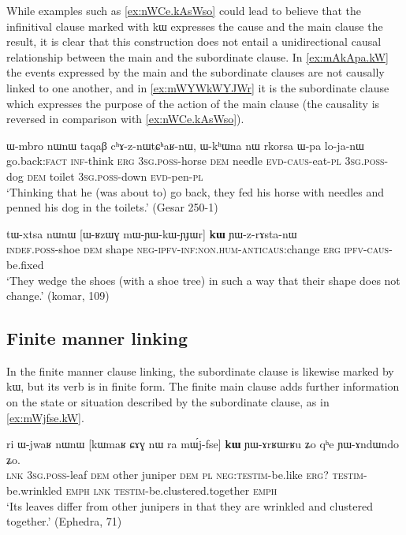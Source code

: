 \documentclass[oldfontcommands,oneside,a4paper,11pt]{article}
\newcommand{\ipa}[1]{{\phon #1}} %
\begin{document}
 While  examples such as \ref{ex:nWCe.kAsWso} could lead to believe that the infinitival clause marked with \ipa{kɯ}  expresses the cause and the main clause the result, it is clear that this construction does not entail a unidirectional causal relationship between the main and the subordinate clause. In \ref{ex:mAkApa.kW} the events expressed by the main and the subordinate clauses are not causally linked to one another, and in  \ref{ex:mWYWkWYJWr} it is the subordinate clause which expresses the purpose of the action of the main clause (the causality is reversed in comparison with \ref{ex:nWCe.kAsWso}).

  \begin{exe}
\ex \label{ex:nWCe.kAsWso}
\gll 
[\ipa{nɯɕe}  	\ipa{kɤ-sɯso}]  	\ipa{kɯ,}  	\ipa{ɯ-mbro}  	\ipa{nɯnɯ}  	\ipa{taqaβ}  	\ipa{cʰɤ-z-nɯtɕʰaʁ-nɯ,}  	\ipa{ɯ-kʰɯna}  	\ipa{nɯ}  	\ipa{rkorsa}  	\ipa{ɯ-pa}  	\ipa{lo-ja-nɯ}  \\
go.back:\textsc{fact} \textsc{inf}-think \textsc{erg} \textsc{3sg.poss}-horse \textsc{dem} needle \textsc{evd-caus}-eat-\textsc{pl}   \textsc{3sg.poss}-dog \textsc{dem} toilet \textsc{3sg.poss}-down \textsc{evd}-pen-\textsc{pl} \\
\glt `Thinking that he (was about to) go back, they fed his horse with needles and penned his dog in the toilets.' (Gesar 250-1)
 \end{exe} 
 
\begin{exe}
\ex \label{ex:mWYWkWYJWr}
\gll
\ipa{tɯ-xtsa}   	\ipa{nɯnɯ}   	[\ipa{ɯ-ʁzɯɣ}   	\ipa{mɯ-ɲɯ-kɯ-ɲɟɯr}]   	\ipa{\textbf{kɯ}}   	\ipa{ɲɯ-z-rɤsta-nɯ}   \\
\textsc{indef.poss}-shoe \textsc{dem} shape \textsc{neg-ipfv-inf:non.hum-anticaus}:change \textsc{erg} \textsc{ipfv-caus}-be.fixed \\
\glt `They wedge the shoes (with a shoe tree)  in such a way that their shape does not change.' (\ipa{komar}, 109)
\end{exe}

\subsection{Finite manner linking}
In the finite manner clause linking, the subordinate clause is likewise marked by \ipa{kɯ}, but its verb is in finite form. The  finite  main clause adds further information on the state or situation described by the subordinate clause, as in \ref{ex:mWjfse.kW}. 
 

 \begin{exe}
\ex \label{ex:mWjfse.kW}
\gll
\ipa{ri} 	\ipa{ɯ-jwaʁ} 	\ipa{nɯnɯ} 	[\ipa{kɯmaʁ} 	\ipa{ɕɤɣ} 	\ipa{nɯ} \ipa{ra} 	\ipa{mɯ́j-fse}] 	\ipa{\textbf{kɯ}} 	\ipa{ɲɯ-ɤrʁɯrʁu} 	\ipa{ʑo} 	\ipa{qʰe} 	\ipa{ɲɯ-ɤndɯndo} 	\ipa{ʑo.} \\
\textsc{lnk} \textsc{3sg.poss}-leaf \textsc{dem} other juniper \textsc{dem} \textsc{pl} \textsc{neg:testim}-be.like \textsc{erg?} \textsc{testim}-be.wrinkled \textsc{emph} \textsc{lnk}  \textsc{testim}-be.clustered.together \textsc{emph} \\
\glt `Its leaves differ from other junipers in that they are wrinkled and clustered together.' (Ephedra, 71)
 \end{exe}
 
\end{document}
